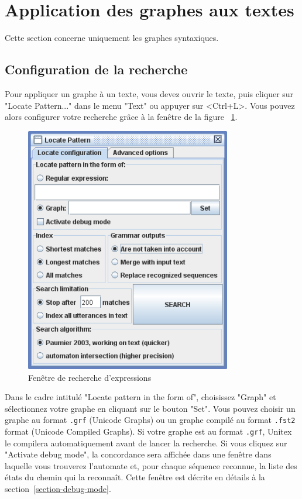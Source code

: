 \section{Application des graphes aux textes}
\label{section-applying-graphs-to-text}
Cette section concerne uniquement les graphes syntaxiques.
\subsection{Configuration de la recherche}
Pour appliquer un graphe à un texte, vous devez ouvrir le texte, puis cliquer sur "Locate
Pattern..." dans le menu "Text" ou appuyer sur <Ctrl+L>. Vous pouvez alors configurer votre
recherche grâce à la fenêtre de la figure
~\ref{fig-regexp-frame}.

\begin{figure}[!ht]
\begin{center}
\includegraphics[width=9cm]{resources/img/fig6-30.png}
\caption{Fenêtre de recherche d’expressions\label{fig-regexp-frame}}
\end{center}
\end{figure}

\noindent Dans le cadre intitulé "Locate pattern in the form of", choisissez "Graph" et sélectionnez
votre graphe en cliquant sur le bouton "Set". Vous pouvez choisir un graphe au format
 \verb+.grf+ (Unicode Graphs) ou un graphe compilé au format \verb+.fst2+ format (Unicode
Compiled Graphs). Si votre graphe est au format \verb+.grf+, Unitex le compilera
 automatiquement avant de lancer la recherche. Si vous cliquez sur "Activate debug mode", la
 concordance sera affichée dans une fenêtre dans laquelle vous trouverez l'automate et, 
 pour chaque séquence reconnue, la liste des états du chemin qui la reconnaît. Cette fenêtre est décrite en détails à la section~\ref{section-debug-mode}.

